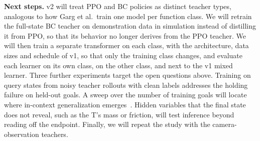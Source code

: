 \textbf{Next steps.} v2 will treat PPO and BC policies as distinct teacher types, analogous to how Garg et al.\ train one model per
function class. We will retrain the full-state BC teacher on demonstration data in simulation instead of distilling it from PPO, so that its
behavior no longer derives from the PPO teacher. We will then train a separate transformer on each class, with the architecture,
data sizes and schedule of v1, so that only the training class changes, and evaluate each learner on its own class, on the other
class, and next to the v1 mixed learner. Three further experiments target the open questions above. Training on query states from
noisy teacher rollouts with clean labels addresses the holding failure on held-out goals. A sweep over the number of training goals
will locate where in-context generalization emerges~\cite{raventos2023pretraining}. Hidden variables that the final state does not
reveal, such as the T's mass or friction, will test inference beyond reading off the endpoint. Finally, we will repeat the study
with the camera-observation teachers.
